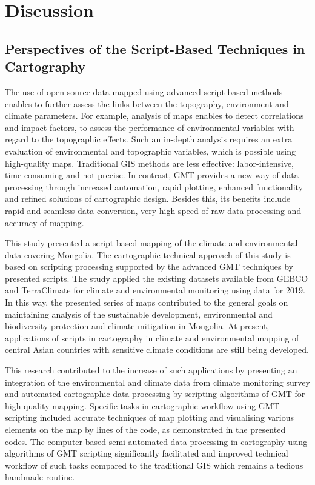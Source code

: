 \documentclass[geosciences,article,accept,pdftex,oneauthor]{Definitions/mdpi}
\begin{document}
\section{Discussion}
\subsection{Perspectives of the Script-Based Techniques in Cartography}

The use of open source data mapped using advanced script-based methods enables to further assess the links between the topography, environment and climate parameters. For example, analysis of maps enables to detect correlations and impact factors, to assess the performance of environmental variables with regard to the topographic effects. Such an in-depth analysis requires an extra evaluation of environmental and topographic variables, which is possible using high-quality maps. Traditional GIS methods are less effective: labor-intensive, time-consuming and not precise. In contrast, GMT provides a new way of data processing through increased automation, rapid plotting, enhanced functionality and refined solutions of cartographic design. Besides this, its benefits include rapid and seamless data conversion, very high speed of raw data processing and accuracy of mapping. 

This study presented a script-based mapping of the climate and environmental data covering Mongolia. The cartographic technical approach of this study is based on scripting processing supported by the advanced GMT techniques by presented scripts. The study applied the existing datasets available from GEBCO and TerraClimate for climate and environmental monitoring using data for 2019. In this way, the presented series of maps contributed to the general goals on maintaining analysis of the sustainable development, environmental and biodiversity protection and climate mitigation in Mongolia. At present, applications of scripts in cartography in climate and environmental mapping of central Asian countries with sensitive climate conditions are still being developed. 

This research contributed to the increase of such applications by presenting an integration of the environmental and climate data from climate monitoring survey and automated cartographic data processing by scripting algorithms of GMT for high-quality mapping. Specific tasks in cartographic workflow using GMT scripting included accurate techniques of map plotting and visualising various elements on the map by lines of the code, as demonstrated in the presented codes. The computer-based semi-automated data processing in cartography using algorithms of GMT scripting significantly facilitated and improved technical workflow of such tasks compared to the traditional GIS which remains a tedious handmade routine. 
\end{document}
